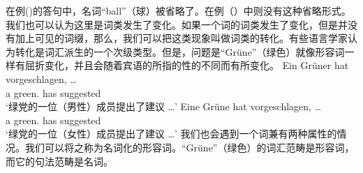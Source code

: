 \noindent
在例()的答句中，名词“ball”（球）被省略了。在例（）中则没有这种省略形式。我们也可以认为这里是词类发生了变化。如果一个词的词类发生了变化，但是并没有加上可见的词缀，那么，我们可以把这类现象叫做词类的转化。有些语言学家认为转化是词汇派生的一个次级类型。但是，问题是“Grüne”（绿色）就像形容词一样有屈折变化，并且会随着宾语的所指的性的不同而有所变化。
\eal
\ex 
\gll Ein Grüner hat vorgeschlagen, \ldots\\
	 a green.\mas{} has suggested\\
\glt `绿党的一位（男性）成员提出了建议 \ldots'
\ex 
\gll Eine Grüne hat vorgeschlagen, \ldots\\
	 a green.\fem{} has suggested\\
\glt `绿党的一位（女性）成员提出了建议 \ldots'
\zl
我们也会遇到一个词兼有两种属性的情况。我们可以将之称为名词化的形容词。“Grüne”（绿色）的词汇范畴是形容词，而它的句法范畴是名词。

